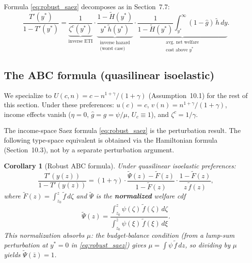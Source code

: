 \documentclass[12pt,a4paper]{article}
\theoremstyle{definition}
\theoremstyle{plain}
\newtheorem{corollary}{Corollary}[section]
\theoremstyle{remark}
\newcommand{\zbar}{\bar{z}}
\newcommand{\zlow}{z_{\scriptscriptstyle 0}}
\begin{document}
Formula \eqref{eq:robust_saez} decomposes as in Section~7.7:
\[
  \frac{T'(y^*)}{1-T'(y^*)}
  = \underbrace{\frac{1}{\zeta^c(y^*)}}_{\text{inverse ETI}}
  \cdot
  \underbrace{\frac{1-\widetilde{H}(y^*)}{y^*\,
    \widetilde{h}(y^*)}}_{\substack{\text{inverse hazard}\\
    \text{(worst case)}}}
  \cdot
  \underbrace{\frac{1}{1-\widetilde{H}(y^*)}
    \int_{y^*}^\infty
    (1-\hat{g})\,\widetilde{h}\,dy}_{\substack{
    \text{avg.\ net welfare}\\
    \text{cost above }y^*}}.
\]





\subsection{The ABC formula (quasilinear isoelastic)}
\label{sec:quasilinear}
\label{sec:ABC}

We specialize to $U(c,n) = c - n^{1+\gamma}/(1+\gamma)$
(Assumption~10.1) for the rest of this section.
Under these preferences: $u(c) = c$,
$v(n) = n^{1+\gamma}/(1+\gamma)$, income effects vanish
($\eta = 0$, $\hat g = g = \psi/\mu$, $U_c \equiv 1$),
and $\zeta^c = 1/\gamma$.

The income-space Saez formula \eqref{eq:robust_saez} is the
perturbation result.  The following type-space equivalent is
obtained via the Hamiltonian formula (Section~10.3), not by
a separate perturbation argument.

\begin{corollary}[Robust ABC formula]
\label{prop:robust_ABC}
Under quasilinear isoelastic preferences:
\begin{equation}
\label{eq:robust_ABC}
  \frac{T'(y(z))}{1 - T'(y(z))}
  = (1+\gamma) \cdot
  \frac{\widetilde\Psi(z) - \widetilde F(z)}{
    1 - \widetilde F(z)} \cdot
  \frac{1 - \widetilde F(z)}{z\,\widetilde f(z)},
\end{equation}
where $\widetilde F(z) = \int_{\zlow}^z \widetilde f\,d\zeta$
and $\widetilde\Psi$ is the \textbf{normalized} welfare cdf
\begin{equation}
\label{eq:Psi_normalized}
  \widetilde\Psi(z)
  = \frac{\int_{\zlow}^z \psi(\zeta)\,
    \widetilde f(\zeta)\,d\zeta}
  {\int_{\zlow}^{\zbar} \psi(\xi)\,
    \widetilde f(\xi)\,d\xi}.
\end{equation}
This normalization absorbs $\mu$: the budget-balance
condition (from a lump-sum perturbation at $y^* = 0$
in \eqref{eq:robust_saez}) gives
$\mu = \int \psi\,\widetilde f\,dz$, so dividing
by $\mu$ yields $\widetilde\Psi(\zbar) = 1$.
\end{corollary}
\end{document}
